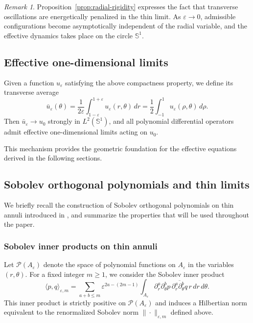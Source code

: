 \documentclass[11pt]{amsart}
\theoremstyle{plain}
\theoremstyle{definition}
\theoremstyle{remark}
\newtheorem{remark}[theorem]{Remark}
\theoremstyle{remark}
\begin{document}
\begin{remark}
Proposition~\ref{prop:radial-rigidity} expresses the fact that transverse
oscillations are energetically penalized in the thin limit.
As $\varepsilon\to0$, admissible configurations become asymptotically
independent of the radial variable, and the effective dynamics takes place
on the circle $\mathbb S^1$.
\end{remark}

\subsection{Effective one-dimensional limits}

Given a function $u_\varepsilon$ satisfying the above compactness property,
we define its transverse average
\[
\bar u_\varepsilon(\theta)
=
\frac{1}{2\varepsilon}
\int_{1-\varepsilon}^{1+\varepsilon} u_\varepsilon(r,\theta)\,dr
=
\frac12\int_{-1}^1 u_\varepsilon(\rho,\theta)\,d\rho.
\]
Then $\bar u_\varepsilon\to u_0$ strongly in $L^2(\mathbb S^1)$, and all
polynomial differential operators admit effective one-dimensional limits
acting on $u_0$.

This mechanism provides the geometric foundation for the effective equations
derived in the following sections.

\subsection{Sobolev orthogonal polynomials and thin limits}
\label{subsec:sobolev-op}

We briefly recall the construction of Sobolev orthogonal polynomials on thin
annuli introduced in \cite{MagnotThinAnnuli}, and summarize the properties that
will be used throughout the paper.

\subsubsection{Sobolev inner products on thin annuli}

Let $\mathcal P(A_\varepsilon)$ denote the space of polynomial functions on
$A_\varepsilon$ in the variables $(r,\theta)$.
For a fixed integer $m\ge1$, we consider the Sobolev inner product
\[
\langle p,q\rangle_{\varepsilon,m}
=
\sum_{a+b\le m}
\varepsilon^{2a-(2m-1)}
\int_{A_\varepsilon}
\partial_r^a\partial_\theta^b p\,
\overline{\partial_r^a\partial_\theta^b q}\,
r\,dr\,d\theta.
\]
This inner product is strictly positive on $\mathcal P(A_\varepsilon)$
and induces a Hilbertian norm equivalent to the renormalized Sobolev norm
$\|\cdot\|_{\varepsilon,m}$ defined above.
\end{document}
